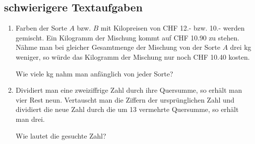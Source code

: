 \subsection{schwierigere Textaufgaben}

\begin{enumerate}[label=\alph*)]
\item
Farben der Sorte $A$ bzw. $B$ mit Kilopreisen von CHF 12.- bzw. 10.-
werden gemischt. Ein Kilogramm der Mischung kommt auf CHF 10.90 zu
stehen.
Nähme man bei gleicher Gesamtmenge der Mischung von der Sorte $A$ drei
kg weniger, so würde das Kilogramm der Mischung nur noch CHF 10.40
kosten.

Wie viele kg nahm man anfänglich von jeder Sorte?

\item
Dividiert man eine zweiziffrige Zahl durch ihre Quersumme, so erhält
man vier Rest neun. Vertauscht man die Ziffern der ursprünglichen Zahl und
dividiert die neue Zahl durch die um 13 vermehrte Quersumme, so erhält
man drei.

Wie lautet die gesuchte Zahl?


\end{enumerate}



